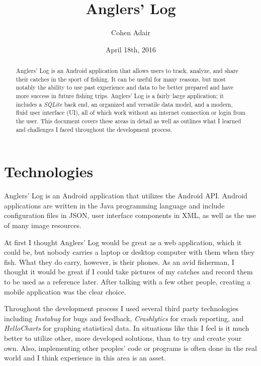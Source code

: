 \documentclass{article}
\title{Anglers' Log}
\author{Cohen Adair}
\date{April 18th, 2016}
\begin{document}
	\maketitle
	
	\begin{abstract}
		Anglers' Log is an Android application that allows users to track, analyze, and share their catches in the sport of fishing.  It can be useful for many reasons, but most notably the ability to use past experience and data to be better prepared and have more success in future fishing trips.  Anglers' Log is a fairly large application; it includes a \textit{SQLite} back end, an organized and versatile data model, and a modern, fluid user interface (UI), all of which work without an internet connection or login from the user.  This document covers these areas in detail as well as outlines what I learned and challenges I faced throughout the development process.
	\end{abstract}
	\newpage
	
	\tableofcontents
	\newpage
	
	
	\section{Technologies}
	
	Anglers' Log is an Android application that utilizes the Android API.  Android applications are written in the Java programming language and include configuration files in JSON, user interface components in XML, as well as the use of many image resources.
	
	At first I thought Anglers' Log would be great as a web application, which it could be, but nobody carries a laptop or desktop computer with them when they fish.	What they do carry, however, is their phones.  As an avid fisherman, I thought it would be great if I could take pictures of my catches and record them to be used as a reference later.  After talking with a few other people, creating a mobile application was the clear choice.
	
	Throughout the development process I used several third party technologies including \textit{Instabug} for bugs and feedback, \textit{Crashlytics} for crash reporting, and \textit{HelloCharts} for graphing statistical data.  In situations like this I feel is it much better to utilize other, more developed solutions, than to try and create your own.  Also, implementing other peoples' code or programs is often done in the real world and I think experience in this area is an asset.
	
\end{document}

